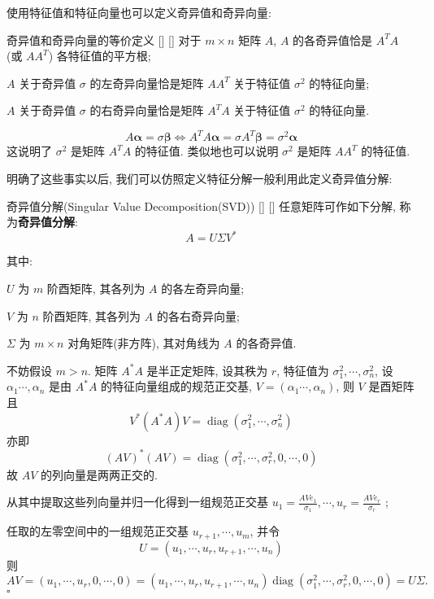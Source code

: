 \documentclass[UTF8]{ctexart}
\DeclareMathOperator{\0}{\mathbf{0}}
\DeclareMathOperator{\<}{\langle}
\renewcommand{\>}{\rangle}
\DeclareMathOperator{\diag}{diag}
\begin{document}
		使用特征值和特征向量也可以定义奇异值和奇异向量: 

		\begin{ppt}
			[]
			{奇异值和奇异向量的等价定义}
			[]
			[]
			对于  \(m\times n\)  矩阵  \(A\),  \(A\)  的各奇异值恰是  \(A^TA\)  (或 \(AA^T\)) 各特征值的平方根; 

			 \(A\)  关于奇异值  \(\sigma\)  的左奇异向量恰是矩阵  \(AA^T\)  关于特征值  \(\sigma^2\)  的特征向量; 
                
             \(A\)  关于奇异值  \(\sigma\)  的右奇异向量恰是矩阵  \(A^TA\)  关于特征值  \(\sigma^2\)  的特征向量. 
		\end{ppt}

		\begin{prf}
			\[
				A\mathbf{\alpha}=\sigma\mathbf{\beta}\iff A^TA\mathbf{\alpha}=\sigma A^T\mathbf{\beta}=\sigma^2\mathbf{\alpha} 
			\]
			这说明了 \(\sigma^2\) 是矩阵 \(A^TA\) 的特征值. 类似地也可以说明 \(\sigma^2\) 是矩阵 \(AA^T\) 的特征值. 
		\end{prf}

		明确了这些事实以后, 我们可以仿照定义特征分解一般利用此定义奇异值分解: 

		\begin{thm}
			[]
			{奇异值分解(Singular Value Decomposition(SVD))}
			[]
			[]
			任意矩阵可作如下分解, 称为\textbf{奇异值分解}: 
                \[A=U\Sigma V^*\]
			
                其中: 
                
                 \(U\)  为  \(m\)  阶酉矩阵, 其各列为  \(A\)  的各左奇异向量; 
                
                 \(V\)  为  \(n\)  阶酉矩阵, 其各列为  \(A\)  的各右奇异向量; 
                
                 \(\Sigma\)  为  \(m\times n\)  对角矩阵(非方阵), 其对角线为  \(A\)  的各奇异值. 
		\end{thm}

		\begin{prf}
			不妨假设 \(m>n\). 矩阵 \(A^*A\) 是半正定矩阵, 设其秩为 \(r\), 特征值为 \(\sigma_1^2,\cdots,\sigma_n^2\), 设 \(\alpha_1\cdots,\alpha_n\) 是由 \(A^*A\) 的特征向量组成的规范正交基,  \(V=(\alpha_1\cdots,\alpha_n)\), 则 \(V\) 是酉矩阵且\[V^*(A^*A)V=\diag(\sigma_1^2,\cdots,\sigma_n^2)\]
			亦即\[(AV)^*(AV)=\diag(\sigma_1^2,\cdots,\sigma_r^2,0,\cdots,0)\]
			故 \(AV\) 的列向量是两两正交的. 

			从其中提取这些列向量并归一化得到一组规范正交基 \(\displaystyle u_1=\frac{AVe_1}{\sigma_1},\cdots, u_r=\frac{AVe_r}{\sigma_r} \) ;

			任取的左零空间中的一组规范正交基 \(u_{r+1},\cdots,u_m\), 并令\[
			U=(u_1,\cdots,u_r,u_{r+1},\cdots,u_n)
			\]
			则\[AV=(u_1,\cdots,u_r,0,\cdots,0)=(u_1,\cdots,u_r,u_{r+1},\cdots,u_n)\diag(\sigma_1^2,\cdots,\sigma_r^2,0,\cdots,0)=U\Sigma.
			\]
			 \(\square\) 
		\end{prf}
\end{document}
